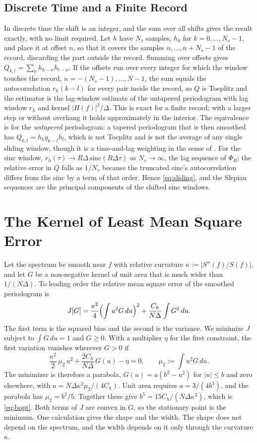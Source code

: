 \documentclass[10pt,twocolumn]{article}
\newcommand{\dd}{\,d}
\begin{document}
\subsection{Discrete Time and a Finite Record}
In discrete time the shift is an integer, and the sum over all shifts gives the result exactly, with no limit required. Let $h$ have $N_s$ samples, $h_k$ for $k=0,\dots,N_s-1$, and place it at offset $n$, so that it covers the samples $n,\dots,n+N_s-1$ of the record, discarding the part outside the record. Summing over offsets gives $Q_{k,l}=\sum_nh_{k-n}h_{l-n}$. If the offsets run over every integer for which the window touches the record, $n=-(N_s-1),\dots,N-1$, the sum equals the autocorrelation $r_h(k-l)$ for every pair inside the record, so $Q$ is Toeplitz and the estimator is the lag-window estimate of the untapered periodogram with lag window $r_h$ and kernel $|H(f)|^2/\Delta$. This is exact for a finite record; with a larger step or without overhang it holds approximately in the interior. The equivalence is for the \emph{untapered} periodogram: a tapered periodogram that is then smoothed has $Q_{k,l}=h_kg_{k-l}h_l$, which is not Toeplitz and is not the average of any single sliding window, though it is a time-and-lag weighting in the sense of \cite{nuttall1982}. For the sinc window, $r_h(\tau)\to R\Delta\,\mathrm{sinc}(R\Delta\tau)$ as $N_s\to\infty$, the lag sequence of $\Phi_R$; the relative error in $Q$ falls as $1/N_s$ because the truncated sinc's autocorrelation differs from the sinc by a term of that order. Hence \eqref{eq:sliding}, and the Slepian sequences are the principal components of the shifted sinc windows.


\section{The Kernel of Least Mean Square Error}
\label{app:variational}
Let the spectrum be smooth near $f$ with relative curvature $\kappa:=|S''(f)/S(f)|$, and let $G$ be a non-negative kernel of unit area that is much wider than $1/(N\Delta)$. To leading order the relative mean square error of the smoothed periodogram is
\begin{equation}
J[G]=\frac{\kappa^2}{4}\Bigl(\int u^2G\dd u\Bigr)^2+\frac{C_h}{N\Delta}\int G^2\dd u .
\label{eq:functional}
\end{equation}
The first term is the squared bias and the second is the variance. We minimize $J$ subject to $\int G\dd u=1$ and $G\ge0$. With a multiplier $\eta$ for the first constraint, the first variation vanishes wherever $G>0$ if
\begin{equation}
\frac{\kappa^2}{2}\,\mu_2\,u^2+\frac{2C_h}{N\Delta}\,G(u)-\eta=0,\qquad\mu_2:=\int u^2G\dd u .
\end{equation}
The minimizer is therefore a parabola, $G(u)=a(b^2-u^2)$ for $|u|\le b$ and zero elsewhere, with $a=N\Delta\kappa^2\mu_2/(4C_h)$. Unit area requires $a=3/(4b^3)$, and the parabola has $\mu_2=b^2/5$. Together these give $b^5=15C_h/(N\Delta\kappa^2)$, which is \eqref{eq:bopt}. Both terms of $J$ are convex in $G$, so the stationary point is the minimum. One calculation gives the shape and the width. The shape does not depend on the spectrum, and the width depends on it only through the curvature $\kappa$.
\end{document}
